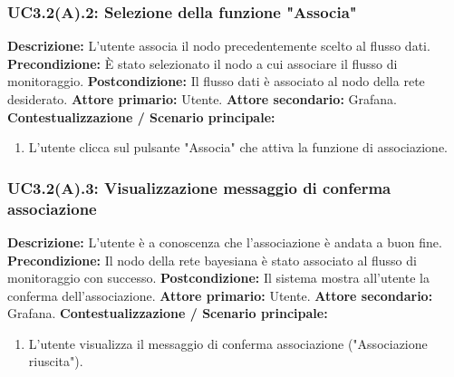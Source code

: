                 \subsubsection{UC3.2(A).2: Selezione della funzione "Associa"}
                    \textbf{Descrizione:} L’utente associa il nodo precedentemente scelto al flusso dati.
                    \newline
                    \textbf{Precondizione:}  È stato selezionato il nodo a cui associare il flusso di monitoraggio.
                    \newline
                    \textbf{Postcondizione:} Il flusso dati è associato al nodo della rete desiderato.
                    \newline
                    \textbf{Attore primario:} Utente.
                    \newline
                    \textbf{Attore secondario:} Grafana.
                    \newline
                    \textbf{Contestualizzazione / Scenario principale:} \begin{enumerate}
                        \item L’utente clicca sul pulsante "Associa" che attiva la funzione di associazione.
                    \end{enumerate} 
                
	           
	            \subsubsection{UC3.2(A).3: Visualizzazione messaggio di conferma associazione}
	                \textbf{Descrizione:} L’utente è a conoscenza che l'associazione è andata a buon fine.
	                \newline
                    \textbf{Precondizione:} Il nodo della rete bayesiana è stato associato al flusso di monitoraggio con successo.
                    \newline
                    \textbf{Postcondizione:} Il sistema mostra all'utente la conferma dell'associazione.
                    \newline
                    \textbf{Attore primario:} Utente.
                    \newline
                    \textbf{Attore secondario:} Grafana.
                    \newline
                    \textbf{Contestualizzazione / Scenario principale:} \begin{enumerate}
                        \item L'utente visualizza il messaggio di conferma associazione ("Associazione riuscita").
                    \end{enumerate}
                    
